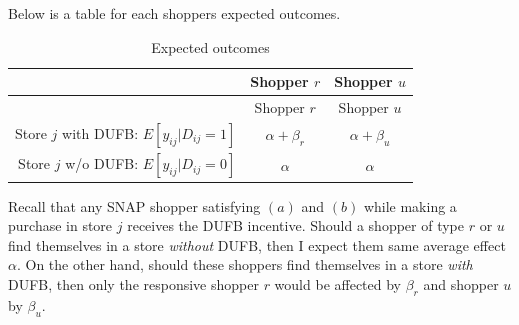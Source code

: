 \documentclass[12pt,letterpaperpaper,]{book}
\begin{document}
Below is a table for each shoppers expected outcomes.

\begin{longtable}[]{@{}rcc@{}}
\caption{\label{tab:expected-outcomes} Expected outcomes}\tabularnewline
\toprule
\begin{minipage}[b]{0.32\columnwidth}\raggedleft\strut
\strut
\end{minipage} & \begin{minipage}[b]{0.32\columnwidth}\centering\strut
Shopper \(r\)\strut
\end{minipage} & \begin{minipage}[b]{0.32\columnwidth}\centering\strut
Shopper \(u\)\strut
\end{minipage}\tabularnewline
\midrule
\endfirsthead
\toprule
\begin{minipage}[b]{0.32\columnwidth}\raggedleft\strut
\strut
\end{minipage} & \begin{minipage}[b]{0.32\columnwidth}\centering\strut
Shopper \(r\)\strut
\end{minipage} & \begin{minipage}[b]{0.32\columnwidth}\centering\strut
Shopper \(u\)\strut
\end{minipage}\tabularnewline
\midrule
\endhead
\begin{minipage}[t]{0.48\columnwidth}\raggedleft\strut
Store \(j\) with DUFB: \(E[y_{ij} \vert D_{ij}=1]\)\strut
\end{minipage} & \begin{minipage}[t]{0.23\columnwidth}\centering\strut
\(\alpha + \beta_{r}\)\strut
\end{minipage} & \begin{minipage}[t]{0.20\columnwidth}\centering\strut
\(\alpha + \beta_u\)\strut
\end{minipage}\tabularnewline
\begin{minipage}[t]{0.48\columnwidth}\raggedleft\strut
Store \(j\) w/o DUFB: \(E[y_{ij} \vert D_{ij}=0]\)\strut
\end{minipage} & \begin{minipage}[t]{0.23\columnwidth}\centering\strut
\(\alpha\)\strut
\end{minipage} & \begin{minipage}[t]{0.20\columnwidth}\centering\strut
\(\alpha\)\strut
\end{minipage}\tabularnewline
\bottomrule
\end{longtable}

Recall that any SNAP shopper satisfying \((a)\) and \((b)\) while making
a purchase in store \(j\) receives the DUFB incentive. Should a shopper
of type \(r\) or \(u\) find themselves in a store \emph{without} DUFB,
then I expect them same average effect \(\alpha\). On the other hand,
should these shoppers find themselves in a store \emph{with} DUFB, then
only the responsive shopper \(r\) would be affected by \(\beta_r\) and
shopper \(u\) by \(\beta_u\).
\end{document}
